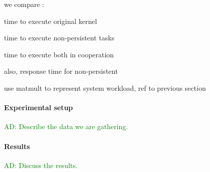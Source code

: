 \documentclass[numbers,nocopyrightspace,10pt]{sigplanconf}
\newcommand{\ADComment}[1]{\textcolor{green}{AD: #1}}
\begin{document}
we compare :

time to execute original kernel

time to execute non-persistent tasks

time to execute both in cooperation

also, response time for non-persistent

use matmult to represent system workload, ref to previous section


\paragraph{Experimental setup}  \ADComment{Describe the data we are gathering.}

\paragraph{Results}  \ADComment{Discuss the results.}
\end{document}
